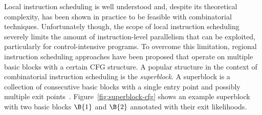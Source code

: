 \documentclass[acmsmall,authorversion,nonacm]{acmart}
\begin{document}
Local instruction scheduling is well understood and, despite its
theoretical complexity, has been shown in practice to be feasible with
combinatorial techniques.
Unfortunately though, the scope of local instruction scheduling
severely limits the amount of instruction-level parallelism that can
be exploited, particularly for control-intensive programs.
To overcome this limitation, regional instruction scheduling
approaches have been proposed that operate on multiple basic blocks
with a certain CFG structure.
A popular structure in the context of combinatorial instruction
scheduling is the \emph{superblock}.
A superblock is a collection of consecutive basic blocks with a single
entry point and possibly multiple exit points~\cite{Hwu1993}.
Figure~\ref{fig:superblock-cfg} shows an example superblock with two
basic blocks $\B{1}$ and $\B{2}$ annotated with their exit
likelihoods.
\end{document}
